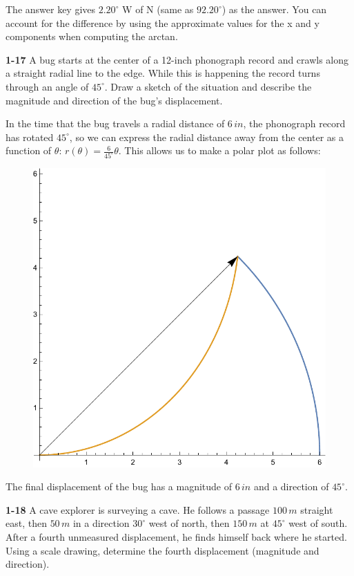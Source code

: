 \documentclass{amsart}
\begin{document}
The answer key gives $2.20^\circ$ W of N (same as $92.20^\circ$) as the answer.
You can account for the difference by using the approximate values for the x and y components
when computing the arctan.

\textbf{1-17} A bug starts at the center of a 12-inch phonograph record and crawls along a straight radial line to the edge.
While this is happening the record turns through an angle of $45^\circ$.
Draw a sketch of the situation and describe the magnitude and direction of the bug's displacement.

In the time that the bug travels a radial distance of $6\,in$, the phonograph record has rotated $45^\circ$,
so we can express the radial distance away from the center as a function of $\theta$: $r(\theta) = \frac{6}{45^\circ} \theta$.
This allows us to make a polar plot as follows:

\begin{figure}[h]
\includegraphics[scale=0.32]{1-17}
\end{figure}

The final displacement of the bug has a magnitude of $6\,in$ and a direction of $45^\circ$.

\textbf{1-18} A cave explorer is surveying a cave.  He follows a passage $100\,m$ straight east, then $50\,m$ in a direction $30^\circ$ west of north, then $150\,m$ at $45^\circ$ west of south.
After a fourth unmeasured displacement, he finds himself back where he started.
Using a scale drawing, determine the fourth displacement (magnitude and direction).
\end{document}

